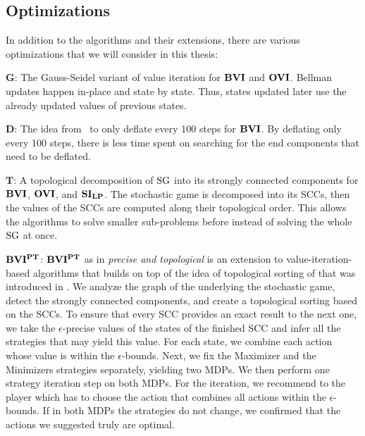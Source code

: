 \subsection{Optimizations} \label{subsec:optimizations}
In addition to the algorithms and their extensions, there are various optimizations that we will consider in this thesis:

$\mathbf{G}$: The Gauss-Seidel variant of value iteration for $\mathbf{BVI}$ and $\mathbf{OVI}$. 
Bellman updates happen in-place and state by state. Thus, states updated later use the already updated values of previous states. 

$\mathbf{D}$: The idea from~\cite{paperMaxi} to only deflate every 100 steps for $\mathbf{BVI}$. 
By deflating only every 100 steps, there is less time spent on searching for the end components that need to be deflated.

$\mathbf{T}$: A topological decomposition of $\textrm{SG}$ into its strongly connected components for $\mathbf{BVI}$, $\mathbf{OVI}$, and $\mathbf{SI_{LP}}$.
The stochastic game is decomposed into its SCCs, then the values of the SCCs are computed along their topological order.
This allows the algorithms to solve smaller sub-problems before instead of solving the whole $\textrm{SG}$ at once.

$\mathbf{BVI^{PT}}$: $\mathbf{BVI^{PT}}$ as in \emph{precise and topological} is an extension to value-iteration-based algorithms that builds on top of the idea of topological sorting of \cite{gandalf} 
that was introduced in \cite{cav22}.
We analyze the graph of the underlying the stochastic game, detect the strongly connected components, and create a topological sorting based on the SCCs.
To ensure that every SCC provides an exact result to the next one, we take the $\epsilon$-precise values of the states of the finished SCC and infer all the
strategies that may yield this value.
For each state, we combine each action whose value is within the $\epsilon$-bounds.
Next, we fix the Maximizer and the Minimizers strategies separately, yielding two MDPs. We then perform one strategy iteration step on both MDPs.
For the iteration, we recommend to the player which has to choose the action that combines all actions within the $\epsilon$-bounds.
If in both MDPs the strategies do not change, we confirmed that the actions we suggested truly are optimal.


